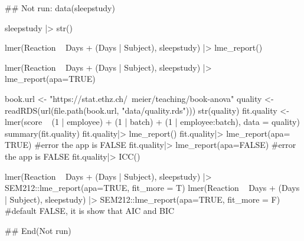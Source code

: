 \documentclass[a4paper]{book}
\begin{document}
\begin{Examples}
\begin{ExampleCode}
\#\# Not run: 
data(sleepstudy)

sleepstudy |> str()

lmer(Reaction ~ Days + (Days | Subject), sleepstudy) |> lme_report()

lmer(Reaction ~ Days + (Days | Subject), sleepstudy) |> lme_report(apa=TRUE)


book.url <- "https://stat.ethz.ch/~meier/teaching/book-anova"
quality <- readRDS(url(file.path(book.url, "data/quality.rds")))
str(quality)
fit.quality <- lmer(score ~ (1 | employee) + (1 | batch) +
                     (1 | employee:batch), data = quality)
summary(fit.quality)
fit.quality|> lme_report()
fit.quality|> lme_report(apa= TRUE) #error the app is FALSE
fit.quality|> lme_report(apa=FALSE) #error the app is FALSE
fit.quality|> ICC()

lmer(Reaction ~ Days + (Days | Subject), sleepstudy) |>
SEM212::lme_report(apa=TRUE, fit_more = T)
lmer(Reaction ~ Days + (Days | Subject), sleepstudy) |>
SEM212::lme_report(apa=TRUE, fit_more = F)  #default FALSE, it is show that AIC and BIC


## End(Not run)

\end{ExampleCode}
\end{Examples}
\end{document}

